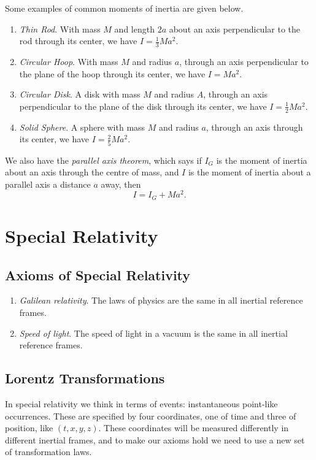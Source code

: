 \documentclass[a4paper]{scrartcl}
\begin{document}
Some examples of common moments of inertia are given below.
\begin{enumerate}
	\item \emph{Thin Rod}. With mass $M$ and length $2a$ about an axis perpendicular to the rod through its center, we have $I = \frac{1}{3}M a^2$.
	\item \emph{Circular Hoop}. With mass $M$ and radius $a$, through an axis perpendicular to the plane of the hoop through its center, we have $I = Ma^2$.
	\item \emph{Circular Disk}. A disk with mass $M$ and radius $A$, through an axis perpendicular to the plane of the disk through its center, we have $I = \frac{1}{2}Ma^2$.
	\item \emph{Solid Sphere}. A sphere with mass $M$ and radius $a$, through an axis through its center, we have $I = \frac{2}{5}Ma^2$. 
\end{enumerate}

We also have the \emph{parallel axis theorem}, which says if $I_G$ is the moment of inertia about an axis through the centre of mass, and $I$ is the moment of inertia about a parallel axis a distance $a$ away, then
$$
I= I_G + Ma^2.
$$


%



\section{Special Relativity}


\subsection{Axioms of Special Relativity}

\begin{enumerate}
	\item \emph{Galilean relativity}. The laws of physics are the same in all inertial reference frames.
	\item \emph{Speed of light}. The speed of light in a vacuum is the same in all inertial reference frames.
\end{enumerate}


\subsection{Lorentz Transformations}

In special relativity we think in terms of events: instantaneous point-like occurrences. These are specified by four coordinates, one of time and three of position, like $(t, x, y, z)$.
These coordinates will be measured differently in different inertial frames, and to make our axioms hold we need to use a new set of transformation laws.
\end{document}
